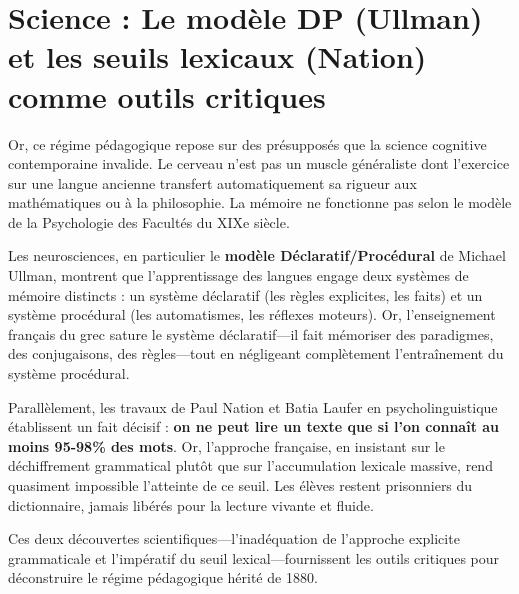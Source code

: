 
\section*{Science : Le modèle DP (Ullman) et les seuils lexicaux (Nation) comme outils critiques}

Or, ce régime pédagogique repose sur des présupposés que la science cognitive contemporaine invalide. Le cerveau n'est pas un muscle généraliste dont l'exercice sur une langue ancienne transfert automatiquement sa rigueur aux mathématiques ou à la philosophie. La mémoire ne fonctionne pas selon le modèle de la Psychologie des Facultés du XIXe siècle.

Les neurosciences, en particulier le \textbf{modèle Déclaratif/Procédural} de Michael Ullman, montrent que l'apprentissage des langues engage deux systèmes de mémoire distincts : un système déclaratif (les règles explicites, les faits) et un système procédural (les automatismes, les réflexes moteurs). Or, l'enseignement français du grec sature le système déclaratif---il fait mémoriser des paradigmes, des conjugaisons, des règles---tout en négligeant complètement l'entraînement du système procédural.

Parallèlement, les travaux de Paul Nation et Batia Laufer en psycholinguistique établissent un fait décisif : \textbf{on ne peut lire un texte que si l'on connaît au moins 95-98\% des mots}. Or, l'approche française, en insistant sur le déchiffrement grammatical plutôt que sur l'accumulation lexicale massive, rend quasiment impossible l'atteinte de ce seuil. Les élèves restent prisonniers du dictionnaire, jamais libérés pour la lecture vivante et fluide.

Ces deux découvertes scientifiques---l'inadéquation de l'approche explicite grammaticale et l'impératif du seuil lexical---fournissent les outils critiques pour déconstruire le régime pédagogique hérité de 1880.
